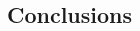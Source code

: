 \documentclass[11pt]{article}
\begin{document}
\begin{multicols}{2}
      \section{Conclusions}

      
      

\end{multicols}
\end{document}
